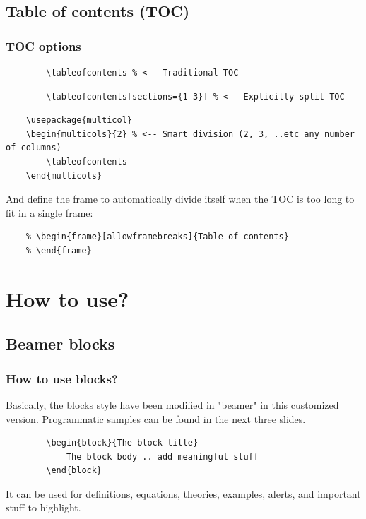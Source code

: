 \documentclass{EESD}
\begin{document}
\subsection{Table of contents (TOC)}
\begin{frame}[fragile]
\frametitle{TOC options}
    \vspace{5pt}
    \begin{lstlisting}
        \tableofcontents % <-- Traditional TOC
    \end{lstlisting}
    \vspace{5pt}
    \begin{lstlisting}
        \tableofcontents[sections={1-3}] % <-- Explicitly split TOC
    \end{lstlisting}
    \vspace{5pt}
    \begin{lstlisting}
    \usepackage{multicol}
    \begin{multicols}{2} % <-- Smart division (2, 3, ..etc any number of columns)
        \tableofcontents
    \end{multicols}
    \end{lstlisting}
    \vspace{5pt}
    And define the frame to automatically divide itself when the TOC is too long to fit in a single frame:
    \begin{lstlisting}
    % \begin{frame}[allowframebreaks]{Table of contents}
    % \end{frame}
    \end{lstlisting}
\end{frame}

\section{How to use?}

\subsection{Beamer blocks}
\begin{frame}[fragile]
\frametitle{How to use blocks?}
    Basically, the blocks style have been modified in "beamer" in this customized version. Programmatic samples can be found in the next three slides.
    \vspace{10pt}
    \begin{lstlisting}
        \begin{block}{The block title}
            The block body .. add meaningful stuff
        \end{block}
    \end{lstlisting}
    \vspace{10pt}
    It can be used for definitions, equations, theories, examples, alerts, and important stuff to highlight.
\end{frame}
\end{document}
